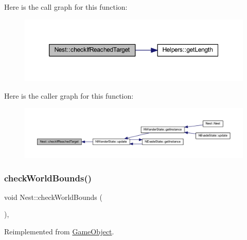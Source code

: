 Here is the call graph for this function\+:
\nopagebreak
\begin{figure}[H]
\begin{center}
\leavevmode
\includegraphics[width=350pt]{class_nest_ad92f26aa5d487d36eec0818e9d71e9d7_cgraph}
\end{center}
\end{figure}
Here is the caller graph for this function\+:
\nopagebreak
\begin{figure}[H]
\begin{center}
\leavevmode
\includegraphics[width=350pt]{class_nest_ad92f26aa5d487d36eec0818e9d71e9d7_icgraph}
\end{center}
\end{figure}
\mbox{\label{class_nest_ab62ba42fc4c7e4c043f29e59ab8c8ea3}} 
\subsubsection{\texorpdfstring{check\+World\+Bounds()}{checkWorldBounds()}}
{\footnotesize\ttfamily void Nest\+::check\+World\+Bounds (\begin{DoxyParamCaption}{ }\end{DoxyParamCaption})\hspace{0.3cm}{\ttfamily [override]}, {\ttfamily [virtual]}}



Reimplemented from \hyperlink{class_game_object_a07bcaf0d87bd507f0a6e98abebd70e53}{Game\+Object}.

